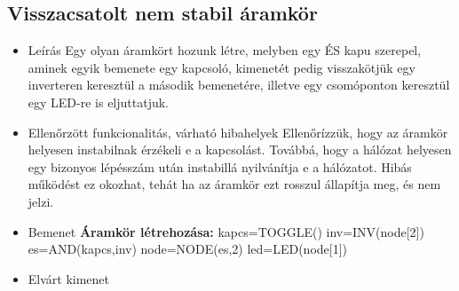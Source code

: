 \subsection{Visszacsatolt nem stabil áramkör}
\begin{itemize}
\item Leírás\newline
Egy olyan áramkört hozunk létre, melyben egy ÉS kapu szerepel, aminek egyik bemenete egy kapcsoló, kimenetét pedig visszakötjük egy inverteren keresztül a második bemenetére, illetve egy csomóponton keresztül egy LED-re is eljuttatjuk.
\item Ellenőrzött funkcionalitás, várható hibahelyek\newline
Ellenőrízzük, hogy az áramkör helyesen instabilnak érzékeli e a kapcsolást. Továbbá, hogy a hálózat helyesen egy bizonyos lépésszám után instabillá nyilvánítja e a hálózatot. Hibás működést ez okozhat, tehát ha az áramkör ezt rosszul állapítja meg, és nem jelzi.
\item Bemenet\newline
\newline
{\bf Áramkör létrehozása:}\newline
kapcs=TOGGLE()\newline
inv=INV(node[2])\newline
es=AND(kapcs,inv)\newline
node=NODE(es,2)\newline
led=LED(node[1])\newline
\item Elvárt kimenet\newline
{}
\end{itemize}


